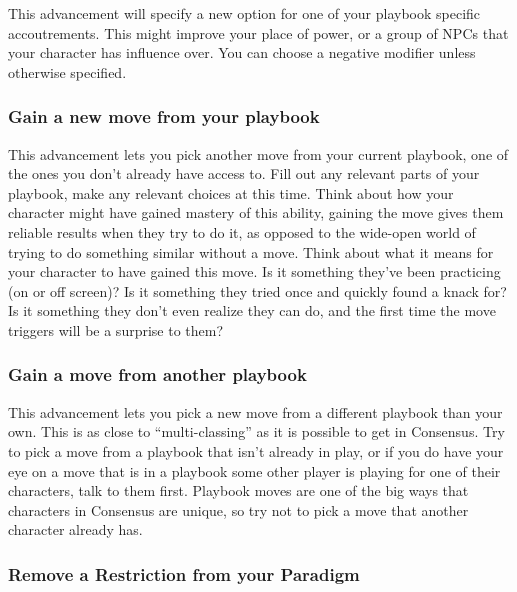 \documentclass[
  oneside,
  statementpaper,
  9pt]{memoir}
\begin{document}
This advancement will specify a new option for one of your playbook
specific accoutrements. This might improve your place of power, or a
group of NPCs that your character has influence over. You can choose a
negative modifier unless otherwise specified.

\hypertarget{gain-a-new-move-from-your-playbook}{%
\subsubsection{Gain a new move from your
playbook}\label{gain-a-new-move-from-your-playbook}}

This advancement lets you pick another move from your current playbook,
one of the ones you don't already have access to. Fill out any relevant
parts of your playbook, make any relevant choices at this time. Think
about how your character might have gained mastery of this ability,
gaining the move gives them reliable results when they try to do it, as
opposed to the wide-open world of trying to do something similar without
a move. Think about what it means for your character to have gained this
move. Is it something they've been practicing (on or off screen)? Is it
something they tried once and quickly found a knack for? Is it something
they don't even realize they can do, and the first time the move
triggers will be a surprise to them?

\hypertarget{gain-a-move-from-another-playbook}{%
\subsubsection{Gain a move from another
playbook}\label{gain-a-move-from-another-playbook}}

This advancement lets you pick a new move from a different playbook than
your own. This is as close to ``multi-classing'' as it is possible to
get in Consensus. Try to pick a move from a playbook that isn't already
in play, or if you do have your eye on a move that is in a playbook some
other player is playing for one of their characters, talk to them first.
Playbook moves are one of the big ways that characters in Consensus are
unique, so try not to pick a move that another character already has.

\hypertarget{remove-a-restriction-from-your-paradigm}{%
\subsubsection{Remove a Restriction from your
Paradigm}\label{remove-a-restriction-from-your-paradigm}}
\end{document}
